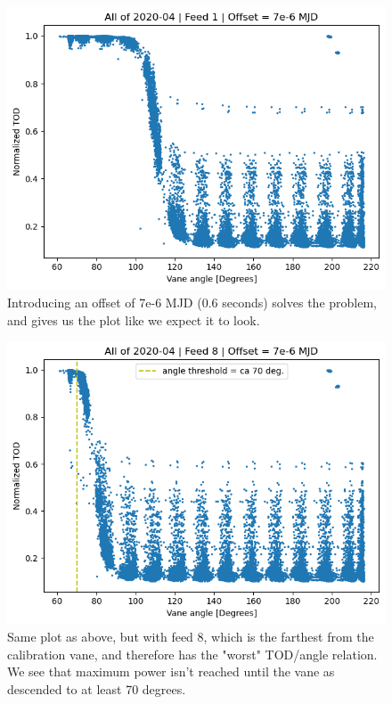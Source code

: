 \documentclass[10pt, a4paper]{article}
\begin{document}
\begin{figure}[h!]
    \centering
    \includegraphics[scale=0.6]{../power_angle_all_7e-6.png}
    \caption{Introducing an offset of 7e-6 MJD (0.6 seconds) solves the problem, and gives us the plot like we expect it to look.}
    \label{}
\end{figure}


\begin{figure}[h!]
    \centering
    \includegraphics[scale=0.6]{../power_angle_all_feed8_7e-6.png}
    \caption{Same plot as above, but with feed 8, which is the farthest from the calibration vane, and therefore has the "worst" TOD/angle relation. We see that maximum power isn't reached until the vane as descended to at least 70 degrees.}
    \label{}
\end{figure}
\end{document}
